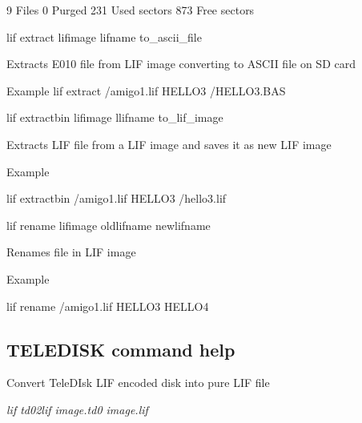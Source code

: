 \begin{DoxyItemize}
\begin{DoxyPre}             9 Files
             0 Purged
           231 Used sectors
           873 Free sectors
      \end{DoxyPre}

\item lif extract lifimage lifname to\+\_\+ascii\+\_\+file
\begin{DoxyItemize}
\item Extracts E010 file from L\+IF image converting to A\+S\+C\+II file on SD card
\item Example lif extract /amigo1.lif H\+E\+L\+L\+O3 /\+H\+E\+L\+L\+O3.B\+AS
\end{DoxyItemize}
\item lif extractbin lifimage llifname to\+\_\+lif\+\_\+image
\begin{DoxyItemize}
\item Extracts L\+IF file from a L\+IF image and saves it as new L\+IF image
\item Example
\begin{DoxyItemize}
\item lif extractbin /amigo1.lif H\+E\+L\+L\+O3 /hello3.lif
\end{DoxyItemize}
\end{DoxyItemize}
\item lif rename lifimage oldlifname newlifname
\begin{DoxyItemize}
\item Renames file in L\+IF image
\item Example
\begin{DoxyItemize}
\item lif rename /amigo1.lif H\+E\+L\+L\+O3 H\+E\+L\+L\+O4 

 \subsection*{T\+E\+L\+E\+D\+I\+SK command help}
\end{DoxyItemize}
\end{DoxyItemize}
\end{DoxyItemize}

Convert Tele\+D\+Isk L\+IF encoded disk into pure L\+IF file
\begin{DoxyItemize}
\item {\itshape lif td02lif image.\+td0 image.\+lif} 

 
\end{DoxyItemize}